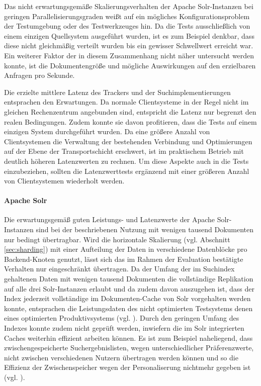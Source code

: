 Das nicht erwartungsgemäße Skalierungsverhalten der Apache Solr-Instanzen bei geringen Parallelisierungsgraden weißt auf ein mögliches Konfigurationsproblem der Testumgebung oder des Testwerkzeuges hin. Da die Tests ausschließlich von einem einzigen Quellsystem ausgeführt wurden, ist es zum Beispiel denkbar, dass diese nicht gleichmäßig verteilt wurden bis ein gewisser Schwellwert erreicht war. Ein weiterer Faktor der in diesem Zusammenhang nicht näher untersucht werden konnte, ist die Dokumentengröße und mögliche Auswirkungen auf den erzielbaren Anfragen pro Sekunde. \citep{solrperformance} 

Die erzielte mittlere Latenz des Trackers und der Suchimplementierungen entsprachen den Erwartungen. Da normale Clientsysteme in der Regel nicht im gleichen Rechenzentrum angebunden sind, entspricht die Latenz nur begrenzt den realen Bedingungen. Zudem konnte sie davon profitieren, dass die Tests auf einem einzigen System durchgeführt wurden. Da eine größere Anzahl von Clientsystemen die Verwaltung der bestehenden Verbindung und Optimierungen auf der Ebene der Transportschicht erschwert, ist im praktischem Betrieb mit deutlich höheren Latenzwerten zu rechnen. Um diese Aspekte auch in die Tests einzubeziehen, sollten die Latenzwerttests ergänzend mit einer größeren Anzahl von Clientsystemen wiederholt werden. \citep{jetty2008}

\paragraph{Apache Solr} Die erwartungsgemäß guten Leistungs- und Latenzwerte der Apache Solr-Instanzen sind bei der beschriebenen Nutzung mit wenigen tausend Dokumenten nur bedingt übertragbar. Wird die horizontale Skalierung (vgl. Abschnitt \ref{sec:sharding}) mit einer Aufteilung der Daten in verschiedene Datenblöcke pro Backend-Knoten genutzt, lässt sich das im Rahmen der Evaluation bestätigte Verhalten nur eingeschränkt übertragen. Da der Umfang der im Suchindex gehaltenen Daten mit wenigen tausend Dokumenten die vollständige Replikation auf alle drei Solr-Instanzen erlaubt und da zudem davon auszugehen ist, dass der Index jederzeit vollständige im Dokumenten-Cache von Solr vorgehalten werden konnte, entsprachen die Leistungsdaten des nicht optimierten Testsystems denen eines optimierten Produktivsystems (vgl. \citep{Rappold2013}).  Durch den geringen Umfang des Indexes konnte zudem nicht geprüft werden, inwiefern die im Solr integrierten Caches weiterhin effizient arbeiten können. Es ist zum Beispiel naheliegend, dass zwischengespeicherte Suchergebnislisten, wegen unterschiedlicher Präferenzwerte, nicht zwischen verschiedenen Nutzern übertragen werden können und so die Effizienz der Zwischenspeicher wegen der Personaliserung nichtmehr gegeben ist (vgl. \citep{solrcache}). 

